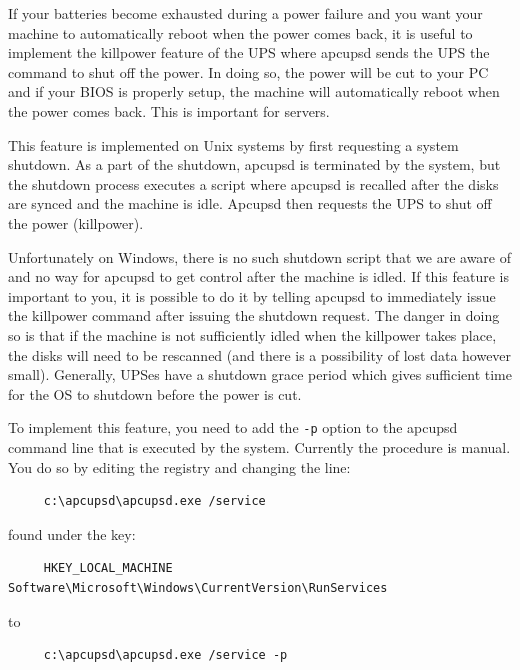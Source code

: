 {{{{{{{\label{index-Windows_002c-Killpower-183}
If your batteries become exhausted during a power failure and you want your
machine to automatically reboot when the power comes back, it is useful to
implement the killpower feature of the UPS where apcupsd sends the UPS the
command to shut off the power.  In doing so, the power will be cut to your PC
and if your BIOS is properly setup, the machine will automatically reboot when
the power comes back. This is important for servers.  

This feature is implemented on Unix systems by first requesting a system
shutdown. As a part of the shutdown, apcupsd is terminated by the system, but
the shutdown process executes a script where apcupsd is recalled after the
disks are synced and the machine is idle. Apcupsd then requests the UPS to
shut off the power (killpower).  

Unfortunately on Windows, there is no such shutdown script that we are aware
of and no way for apcupsd to get control after the machine is idled. If this
feature is important to you, it is possible to do it by telling apcupsd to
immediately issue the killpower command after issuing the shutdown request.
The danger in doing so is that if the machine is not sufficiently idled when
the killpower takes place, the disks will need to be rescanned (and there is a
possibility of lost data however small). Generally, UPSes have a shutdown
grace period which gives sufficient time for the OS to shutdown before the
power is cut.  

To implement this feature, you need to add the {\tt -p} option to the apcupsd
command line that is executed by the system.  Currently the procedure is
manual. You do so by editing the registry and changing the line: 

\footnotesize
\begin{verbatim}
     c:\apcupsd\apcupsd.exe /service
\end{verbatim}
\normalsize

found under the key: 

\footnotesize
\begin{verbatim}
     HKEY_LOCAL_MACHINE Software\Microsoft\Windows\CurrentVersion\RunServices
\end{verbatim}
\normalsize

to 

\footnotesize
\begin{verbatim}
     c:\apcupsd\apcupsd.exe /service -p
\end{verbatim}
\normalsize

}}}}}}}
